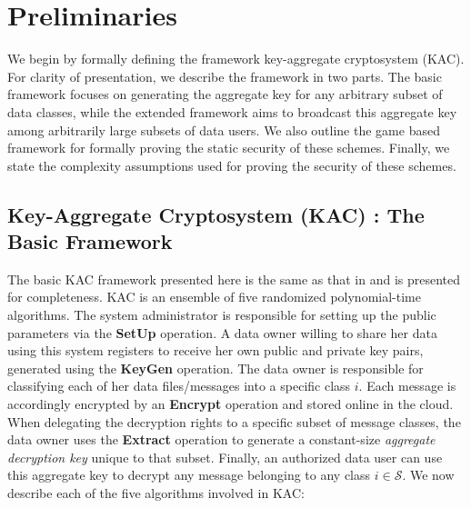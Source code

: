 \section{Preliminaries}
\label{sec:prelims}

We begin by formally defining the framework key-aggregate cryptosystem (KAC). For clarity of presentation, we describe the framework in two parts. The basic framework focuses on generating the aggregate key for any arbitrary subset of data classes, while the extended framework aims to broadcast this aggregate key among arbitrarily large subsets of data users. We also outline the game based framework for formally proving the static security of these schemes. Finally, we state the complexity assumptions used for proving the security of these schemes.  


\subsection{Key-Aggregate Cryptosystem (KAC) : The Basic Framework}
\label{subsec:KACFramework}

The basic KAC framework presented here is the same as that in \cite{chu2014key} and is presented for completeness. KAC is an ensemble of five randomized polynomial-time algorithms. The system administrator is responsible for setting up the public parameters via the \textbf{SetUp} operation. A data owner willing to share her data using this system registers to receive her own public and private key pairs, generated using the \textbf{KeyGen} operation. The data owner is responsible for classifying each of her data files/messages into a specific class $i$. Each message is accordingly encrypted by an \textbf{Encrypt} operation and stored online in the cloud. When delegating the decryption rights to a specific subset of message classes, the data owner uses the \textbf{Extract} operation to generate a constant-size \emph{aggregate decryption key} unique to that subset. Finally, an authorized data user can use this aggregate key to decrypt any message belonging to any class $i\in\mathcal{S}$. We now describe each of the five algorithms involved in KAC: 

